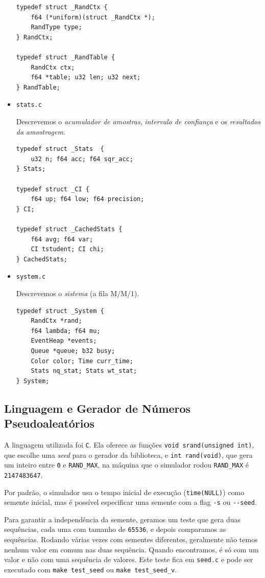 \documentclass[a4paper]{article}
\newcommand{\arq}{\texttt}
\newcommand{\inlcode}{\texttt}
\newcommand{\lang}{\texttt}
\begin{document}
\begin{itemize}
\begin{verbatim}
typedef struct _RandCtx {
    f64 (*uniform)(struct _RandCtx *);
    RandType type;
} RandCtx;

typedef struct _RandTable {
    RandCtx ctx;
    f64 *table; u32 len; u32 next;
} RandTable;
        \end{verbatim}
    \item \arq{stats.c} \par
        Descrevemos o \emph{acumulador de amostras},
        \emph{intervalo de confiança} e
        os \emph{resultados da amostragem}.
        \begin{verbatim}
typedef struct _Stats  {
    u32 n; f64 acc; f64 sqr_acc;
} Stats;

typedef struct _CI {
    f64 up; f64 low; f64 precision;
} CI;

typedef struct _CachedStats {
    f64 avg; f64 var;
    CI tstudent; CI chi;
} CachedStats;
        \end{verbatim}
    \item \arq{system.c} \par
        Descrevemos o \emph{sistema} (a fila M/M/1).
        \begin{verbatim}
typedef struct _System {
    RandCtx *rand;
    f64 lambda; f64 mu;
    EventHeap *events;
    Queue *queue; b32 busy;
    Color color; Time curr_time;
    Stats nq_stat; Stats wt_stat;
} System;
        \end{verbatim}
\end{itemize}

\subsection{Linguagem e Gerador de Números Pseudoaleatórios}
A linguagem utilizada foi \lang{C}.
Ela oferece as funções \inlcode{void srand(unsigned int)},
que escolhe uma \emph{seed} para o gerador da biblioteca,
e \inlcode{int rand(void)}, que gera um inteiro entre
\inlcode{0} e \inlcode{RAND\_MAX},
na máquina que o simulador rodou
\inlcode{RAND\_MAX} é \inlcode{2147483647}.

Por padrão, o simulador usa
o tempo inicial de execução (\inlcode{time(NULL)})
como semente inicial,
mas é possível especificar uma semente com a flag
\inlcode{-s} ou \inlcode{-{}-seed}.

Para garantir a independência da semente,
geramos um teste que gera duas sequências,
cada uma com tamanho de \inlcode{65536},
e depois comparamos as sequências.
Rodando várias vezes com sementes diferentes,
geralmente não temos nenhum valor em comum
nas duas sequência.
Quando encontramos, é só com um valor
e não com uma sequência de valores.
Este teste fica em \arq{seed.c} e
pode ser executado com
\inlcode{make test\_seed} ou
\inlcode{make test\_seed\_v}.
\end{document}
